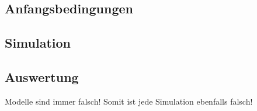 \subsection{Anfangsbedingungen \label{openfoam:section:Anfangsbedingungen}}


\subsection{Simulation \label{openfoam:section:Simulation}}


\subsection{Auswertung \label{openfoam:section:Auswertung}}


\begin{center}
        Modelle sind immer falsch! Somit ist jede Simulation ebenfalls falsch!
\end{center}